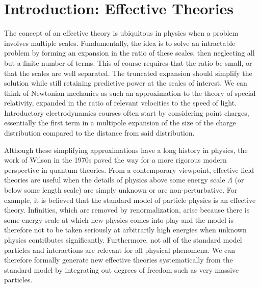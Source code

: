 \chapter{\label{chap:Introduction}Introduction: Effective Theories}

The concept of an effective theory is ubiquitous in physics when a problem involves multiple scales. Fundamentally, the idea is to solve an intractable problem by forming an expansion in the ratio of these scales, then neglecting all but a finite number of terms. This of course requires that the ratio be small, or that the scales are well separated. The truncated expansion should simplify the solution while still retaining predictive power at the scales of interest. We can think of Newtonian mechanics as such an approximation to the theory of special relativity, expanded in the ratio of relevant velocities to the speed of light. Introductory electrodynamics courses often start by considering point charges, essentially the first term in a multipole expansion of the size of the charge distribution compared to the distance from said distribution.

Although these simplifying approximations have a long history in physics,  the work of Wilson \cite{Wilson197475} in the 1970s paved the way for a more rigorous modern perspective in quantum theories. From a contemporary viewpoint, effective field theories are useful when the details of physics above some energy scale $\Lambda$ (or below some length scale) are simply unknown or are non-perturbative. For example, it is believed that the standard model of particle physics is an effective theory. Infinities, which are removed by renormalization, arise because there is some energy scale at which new physics comes into play and the model is therefore not to be taken seriously at arbitrarily high energies when unknown physics contributes significantly. Furthermore, not all of the standard model particles and interactions are relevant for all physical phenomena. We can therefore formally generate new effective theories systematically from the standard model by integrating out degrees of freedom such as very massive particles. 

